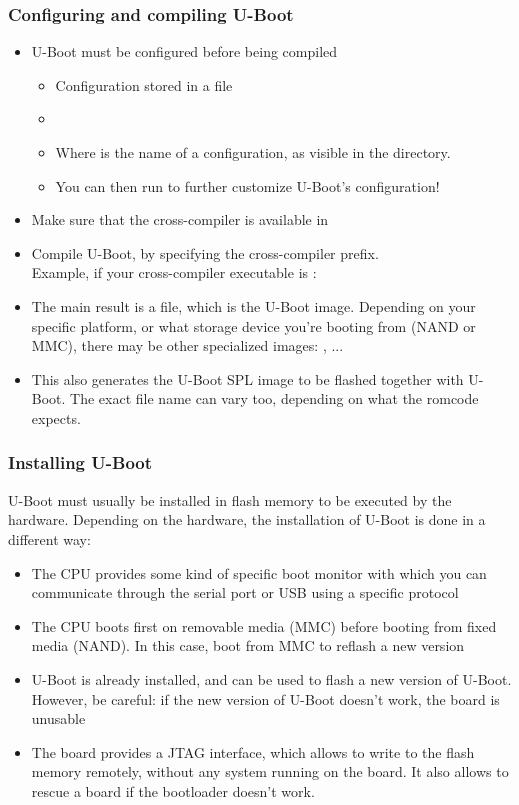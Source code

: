 \begin{frame}
  \frametitle{Configuring and compiling U-Boot}
  \begin{itemize}
  \item U-Boot must be configured before being compiled
    \begin{itemize}
    \item Configuration stored in a  file
    \item {}
    \item Where  is the name of a configuration, as
      visible in the  directory.
    \item You can then run  to further customize
      U-Boot's configuration!
    \end{itemize}
  \item Make sure that the cross-compiler is available in 
  \item Compile U-Boot, by specifying the cross-compiler prefix.\\
    Example, if your cross-compiler executable is :\\
  \item The main result is a  file, which is the
    U-Boot image. Depending on your specific platform, or what storage
    device you're booting from (NAND or MMC), there may be
    other specialized images: , ...
  \item This also generates the U-Boot SPL image to be flashed
    together with U-Boot. The exact file name can vary too, depending
    on what the romcode expects.
  \end{itemize}
\end{frame}

\begin{frame}
  \frametitle{Installing U-Boot}
  U-Boot must usually be installed in flash memory to be
  executed by the hardware. Depending on the hardware, the
  installation of U-Boot is done in a different way:
  \begin{itemize}
  \item The CPU provides some kind of specific boot monitor with
    which you can communicate through the serial port or USB using a
    specific protocol
  \item The CPU boots first on removable media (MMC) before booting
    from fixed media (NAND). In this case, boot from MMC to reflash
    a new version
  \item U-Boot is already installed, and can be used to flash a new
    version of U-Boot. However, be careful: if the new version of
    U-Boot doesn't work, the board is unusable
  \item The board provides a JTAG interface, which allows to write
    to the flash memory remotely, without any system running on the
    board. It also allows to rescue a board if the bootloader
    doesn't work.
  \end{itemize}
\end{frame}

